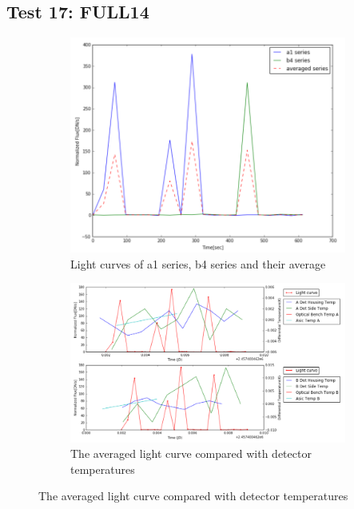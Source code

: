 \documentclass[conference]{IEEEtran}
\begin{document}
\subsection{Test 17: FULL14} 
\begin{figure}[H]
    \centering
    \begin{subfigure}{1}
        \includegraphics[scale=0.4]{ts_test17}
        \caption{Light curves of a1 series, b4 series and their average}
    \end{subfigure}

    \begin{subfigure}{2}
        \includegraphics[scale=0.4]{temp_test17}
        \caption{The averaged light curve compared with detector temperatures}
    \end{subfigure}
   

\end{figure}
\end{document}
